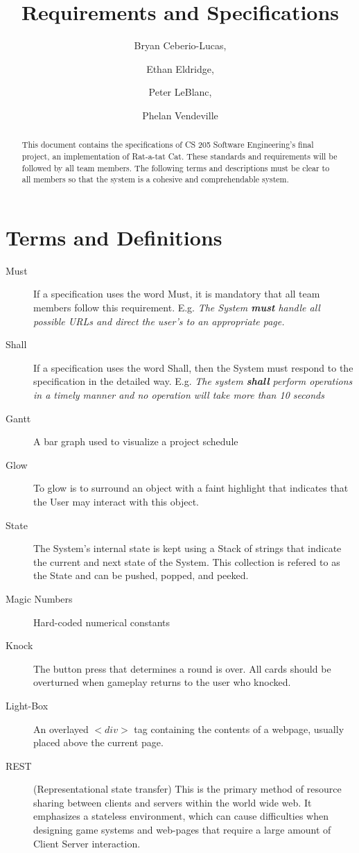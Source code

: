 \documentclass[12pt]{IEEEtran}
\title{Requirements and Specifications}
\author{Bryan Ceberio-Lucas, \and Ethan Eldridge, \and Peter LeBlanc, \and Phelan Vendeville }
\begin{document}
\maketitle

\begin{abstract}
	This document contains the specifications of CS 205 Software  Engineering's final project, an implementation of Rat-a-tat Cat. These standards and requirements will be followed by all team members. The following terms and descriptions must be clear to all members so that the system is a cohesive and comprehendable system.
\end{abstract}

\tableofcontents

\section{Terms and Definitions}
\label{sec:TermsDefinitions}
	\begin{description}
		\item[Must] If a specification uses the word Must, it is mandatory that all team members follow this requirement. E.g.  \textit{The System \textbf{must} handle all possible URLs and direct the user's to an appropriate page.} 
		\item[Shall] If a specification uses the word Shall, then the System must respond to the specification in the detailed way. E.g. \textit{The system \textbf{shall} perform operations in a timely manner and no operation will take more than 10 seconds}
		\item[Gantt] A bar graph used to visualize a project schedule
		\item[Glow] To glow is to surround an object with a faint highlight that indicates that the User may interact with this object.
		\item[State] The System's internal state is kept using a Stack of strings that indicate the current and next state of the System. This collection is refered to as the State and can be pushed, popped, and 	peeked.
		\item[Magic Numbers] \hspace{4em} Hard-coded numerical constants 
		\item[Knock] \hspace{.5em} The button press that determines a round is over. All cards should be overturned when gameplay returns to the user who knocked.
		\item[Light-Box] \hspace{2em}An overlayed $<div>$ tag containing the contents of a webpage, usually placed above the current page.
		\item[REST] (Representational state transfer) This is the primary method of resource sharing between clients and servers within the world wide web. It emphasizes a stateless environment, which can cause difficulties when designing game systems and web-pages that require a large amount of Client Server interaction.
	\end{description}
\end{document}
